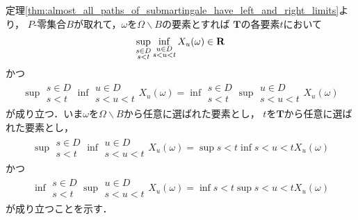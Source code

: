 	\begin{sketch}
		定理\ref{thm:almost_all_paths_of_submartingale_have_left_and_right_limits}より，
		$P$-零集合$B$が取れて，$\omega$を$\Omega \backslash B$の要素とすれば
		$\mathbf{T}$の各要素$t$において
		\begin{align}
			\operatorname*{sup}_{\substack{s \in D \\ s < t}} \operatorname*{inf}_{\substack{u \in D \\ s < u < t}} X_u(\omega) \in \mathbf{R}
		\end{align}
		かつ
		\begin{align}
			\sup{\substack{s \in D \\ s < t}}{\inf{\substack{u \in D \\ s < u < t}}{X_u(\omega)}} 
			= \inf{\substack{s \in D \\ s < t}}{\sup{\substack{u \in D \\ s < u < t}}{X_u(\omega)}}
		\end{align}
		が成り立つ．いま$\omega$を$\Omega \backslash B$から任意に選ばれた要素とし，
		$t$を$\mathbf{T}$から任意に選ばれた要素とし，
		\begin{align}
			\sup{\substack{s \in D \\ s < t}}{\inf{\substack{u \in D \\ s < u < t}}{X_u(\omega)}}
			= \sup{s < t}{\inf{s < u < t}{X_u(\omega)}}
		\end{align}
		かつ
		\begin{align}
			\inf{\substack{s \in D \\ s < t}}{\sup{\substack{u \in D \\ s < u < t}}{X_u(\omega)}}
			= \inf{s < t}{\sup{s < u < t}{X_u(\omega)}}
		\end{align}
		が成り立つことを示す．
		
	\end{sketch}